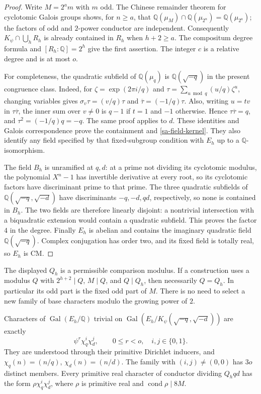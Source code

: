 \begin{proof}
Write $M=2^am$ with $m$ odd. The Chinese remainder theorem for
cyclotomic Galois groups shows, for $n\ge a$, that
$\mathbb Q(\mu_M)\cap\mathbb Q(\mu_{2^n})=
\mathbb Q(\mu_{2^a})$; the factors of odd and $2$-power conductor
are independent. Consequently $K_\psi\cap\bigcup_hR_h$ is
already contained in $R_h$ when $h+2\ge a$. The compositum degree
formula and $[R_h:\mathbb Q]=2^h$ give the first assertion.
The integer $c$ is a relative degree and is at most $o$.

For completeness, the quadratic subfield of $\mathbb Q(\mu_q)$
is $\mathbb Q(\sqrt{-q})$ in the present congruence class. Indeed,
for $\zeta=\exp(2\pi i/q)$ and
$\tau=\sum_{u\bmod q}(u/q)\zeta^u$, changing variables gives
$\sigma_v\tau=(v/q)\tau$ and $\overline\tau=(-1/q)\tau$.
Also, writing $u=tv$ in $\tau\overline\tau$, the inner sum over
$v\ne0$ is $q-1$ if $t=1$ and $-1$ otherwise. Hence
$\tau\overline\tau=q$, and $\tau^2=(-1/q)q=-q$.
The same proof applies to $d$. These identities and Galois
correspondence prove the containment and \eqref{sa-field-kernel}.
They also identify any field specified by that fixed-subgroup
condition with $E_h$ up to a $\mathbb Q$-isomorphism.

The field $B_h$ is unramified at $q,d$: at a prime not dividing
its cyclotomic modulus, the polynomial $X^n-1$ has invertible
derivative at every root, so its cyclotomic factors have
discriminant prime to that prime. The three quadratic
subfields of $\mathbb Q(\sqrt{-q},\sqrt{-d})$ have discriminants
$-q,-d,qd$, respectively, so none is contained in $B_h$.
The two fields are therefore linearly disjoint: a nontrivial
intersection with a biquadratic extension would contain a
quadratic subfield. This proves the factor $4$ in the degree.
Finally $E_h$ is abelian and contains the imaginary quadratic
field $\mathbb Q(\sqrt{-q})$. Complex conjugation has order two,
and its fixed field is totally real, so $E_h$ is CM.
\end{proof}

The displayed $Q_h$ is a permissible comparison modulus. If a
construction uses a modulus $Q$ with
$2^{h+2}\mid Q$, $M\mid Q$, and $Q\mid Q_h$, then necessarily
$Q=Q_h$. In particular its odd part is the fixed odd part of $M$.
There is no need to select a new family of base characters modulo
the growing power of $2$.

\begin{lemma}\label{sa-character-families}
Characters of $\operatorname{Gal}(E_h/\mathbb Q)$ trivial on
$\operatorname{Gal}(E_h/K_\psi(\sqrt{-q},\sqrt{-d}))$ are exactly
\[
             \psi^r\chi_q^i\chi_d^j,
 \qquad 0\le r<o,\quad i,j\in\{0,1\}.
\]
They are understood through their primitive Dirichlet inducers,
and $\chi_q(n)=(n/q)$, $\chi_d(n)=(n/d)$.
The family with $(i,j)\ne(0,0)$ has $3o$ distinct members.
Every primitive real character of conductor dividing $Q_hqd$
has the form $\rho\chi_q^i\chi_d^j$, where $\rho$ is primitive
real and $\operatorname{cond}\rho\mid8M$.
\end{lemma}

